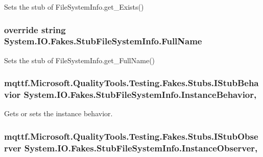 Sets the stub of File\-System\-Info.\-get\-\_\-\-Exists()

\hypertarget{class_system_1_1_i_o_1_1_fakes_1_1_stub_file_system_info_a3224fb705831402b32ee1f094daeec5e}{
\subsubsection[{Full\-Name}]{\setlength{\rightskip}{0pt plus 5cm}override string System.\-I\-O.\-Fakes.\-Stub\-File\-System\-Info.\-Full\-Name\hspace{0.3cm}{\ttfamily [get]}}}\label{class_system_1_1_i_o_1_1_fakes_1_1_stub_file_system_info_a3224fb705831402b32ee1f094daeec5e}


Sets the stub of File\-System\-Info.\-get\-\_\-\-Full\-Name()

\hypertarget{class_system_1_1_i_o_1_1_fakes_1_1_stub_file_system_info_a3a65157b93d1408528aff862affe68d6}{
\subsubsection[{Instance\-Behavior}]{\setlength{\rightskip}{0pt plus 5cm}mqttf.\-Microsoft.\-Quality\-Tools.\-Testing.\-Fakes.\-Stubs.\-I\-Stub\-Behavior System.\-I\-O.\-Fakes.\-Stub\-File\-System\-Info.\-Instance\-Behavior\hspace{0.3cm}{\ttfamily [get]}, {\ttfamily [set]}}}\label{class_system_1_1_i_o_1_1_fakes_1_1_stub_file_system_info_a3a65157b93d1408528aff862affe68d6}


Gets or sets the instance behavior.

\hypertarget{class_system_1_1_i_o_1_1_fakes_1_1_stub_file_system_info_a313b4afac0eb50c485d564653d3ba6cd}{
\subsubsection[{Instance\-Observer}]{\setlength{\rightskip}{0pt plus 5cm}mqttf.\-Microsoft.\-Quality\-Tools.\-Testing.\-Fakes.\-Stubs.\-I\-Stub\-Observer System.\-I\-O.\-Fakes.\-Stub\-File\-System\-Info.\-Instance\-Observer\hspace{0.3cm}{\ttfamily [get]}, {\ttfamily [set]}}}\label{class_system_1_1_i_o_1_1_fakes_1_1_stub_file_system_info_a313b4afac0eb50c485d564653d3ba6cd}


